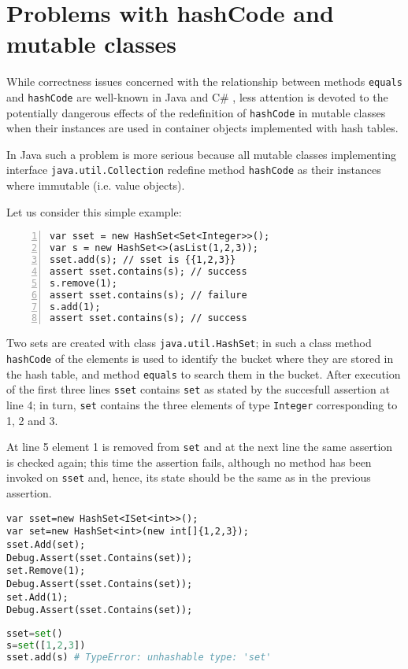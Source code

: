 \section{Problems with hashCode and mutable classes}

While correctness issues concerned with the relationship between methods \lstinline{equals} and \lstinline{hashCode} are well-known
in Java and C\# \cite{Bloch18,OkanoHSON19}, less attention is devoted to the potentially dangerous effects of the redefinition of 
\lstinline{hashCode} in mutable classes when their instances are used in container objects implemented with hash tables.

In Java such a problem is more serious because all mutable classes implementing interface \lstinline{java.util.Collection} redefine
method \lstinline{hashCode} as their instances where immutable (i.e. value objects).

Let us consider this simple example:
\begin{lstlisting}[numbers=left]
var sset = new HashSet<Set<Integer>>();
var s = new HashSet<>(asList(1,2,3));
sset.add(s); // sset is {{1,2,3}}
assert sset.contains(s); // success
s.remove(1);
assert sset.contains(s); // failure
s.add(1);
assert sset.contains(s); // success
\end{lstlisting}
Two sets are created with class \lstinline{java.util.HashSet}; in such a class method \lstinline{hashCode} of the elements is used to identify the
bucket where they are stored in the hash table, and method \lstinline{equals} to search them in the bucket.
After execution of the first three lines \lstinline{sset} contains \lstinline{set} as stated by the succesfull assertion at line 4; in turn, \lstinline{set}
contains the three elements of type \lstinline{Integer} corresponding to 1, 2 and 3.

At line 5 element 1 is removed from \lstinline{set} and at the next line the same assertion is checked again; this time the assertion fails, although no method has been invoked on \lstinline{sset} and, hence, its state should be the same as in the previous assertion.


\begin{lstlisting}
var sset=new HashSet<ISet<int>>();
var set=new HashSet<int>(new int[]{1,2,3});
sset.Add(set);
Debug.Assert(sset.Contains(set));
set.Remove(1);
Debug.Assert(sset.Contains(set));
set.Add(1);
Debug.Assert(sset.Contains(set));
\end{lstlisting}


\begin{lstlisting}[language=Python]
sset=set()                                                           
s=set([1,2,3])                                                         
sset.add(s) # TypeError: unhashable type: 'set'       
\end{lstlisting}

